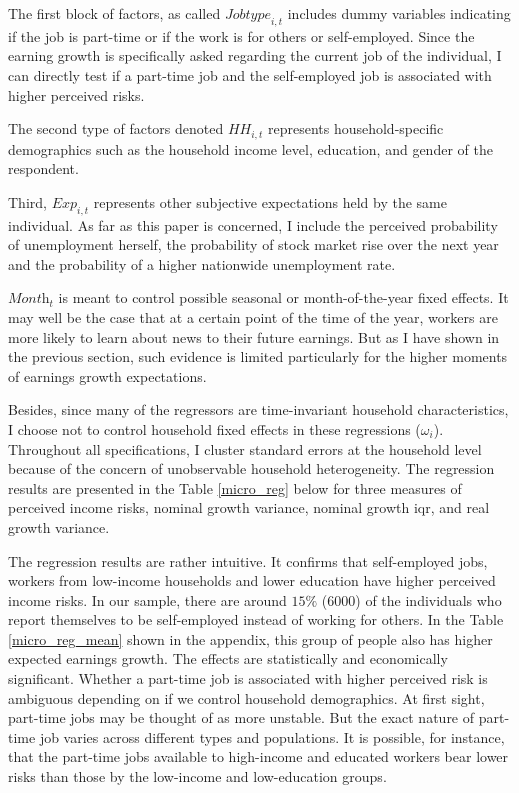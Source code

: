 \documentclass[12pt,notitlepage,onecolumn,aps,pra]{article}
\begin{document}
The first block of factors, as called \(\textit{Jobtype}_{i,t}\)
includes dummy variables indicating if the job is part-time or if the
work is for others or self-employed. Since the earning growth is
specifically asked regarding the current job of the individual, I can
directly test if a part-time job and the self-employed job is associated
with higher perceived risks.

The second type of factors denoted \(\textit{HH}_{i,t}\) represents
household-specific demographics such as the household income level,
education, and gender of the respondent.

Third, \(\textit{Exp}_{i,t}\) represents other subjective expectations
held by the same individual. As far as this paper is concerned, I
include the perceived probability of unemployment herself, the
probability of stock market rise over the next year and the probability
of a higher nationwide unemployment rate.

\(\textit{Month}_t\) is meant to control possible seasonal or
month-of-the-year fixed effects. It may well be the case that at a
certain point of the time of the year, workers are more likely to learn
about news to their future earnings. But as I have shown in the previous
section, such evidence is limited particularly for the higher moments of
earnings growth expectations.

Besides, since many of the regressors are time-invariant household
characteristics, I choose not to control household fixed effects in
these regressions (\(\omega_i\)). Throughout all specifications, I
cluster standard errors at the household level because of the concern of
unobservable household heterogeneity. The regression results are
presented in the Table \ref{micro_reg} below for three measures of
perceived income risks, nominal growth variance, nominal growth iqr, and
real growth variance.

The regression results are rather intuitive. It confirms that
self-employed jobs, workers from low-income households and lower
education have higher perceived income risks. In our sample, there are
around \(15\%\) (6000) of the individuals who report themselves to be
self-employed instead of working for others. In the Table
\ref{micro_reg_mean} shown in the appendix, this group of people also
has higher expected earnings growth. The effects are statistically and
economically significant. Whether a part-time job is associated with
higher perceived risk is ambiguous depending on if we control household
demographics. At first sight, part-time jobs may be thought of as more
unstable. But the exact nature of part-time job varies across different
types and populations. It is possible, for instance, that the part-time
jobs available to high-income and educated workers bear lower risks than
those by the low-income and low-education groups.
\end{document}
